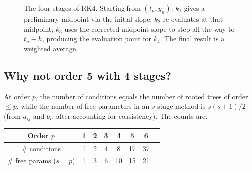 \documentclass[12pt,a4paper]{article}
\theoremstyle{definition}
\theoremstyle{plain}
\theoremstyle{remark}
\begin{document}
\begin{figure}[ht]
\caption{The four stages of RK4. Starting from $(t_n, y_n)$: $k_1$ gives a preliminary midpoint via the initial slope; $k_2$ re-evaluates at that midpoint; $k_3$ uses the corrected midpoint slope to step all the way to $t_n + h$, producing the evaluation point for $k_4$. The final result is a weighted average.}
\label{fig:stages}
\end{figure}

\subsection{Why not order 5 with 4 stages?}

At order $p$, the number of conditions equals the number of rooted trees of order $\leq p$, while the number of free parameters in an $s$-stage method is $s(s+1)/2$ (from $a_{ij}$ and $b_i$, after accounting for consistency). The counts are:

\begin{center}
\begin{tabular}{c|ccccccc}
Order $p$ & 1 & 2 & 3 & 4 & 5 & 6 \\
\hline
\# conditions & 1 & 2 & 4 & 8 & 17 & 37 \\
\# free params ($s=p$) & 1 & 3 & 6 & 10 & 15 & 21
\end{tabular}
\end{center}
\end{document}
